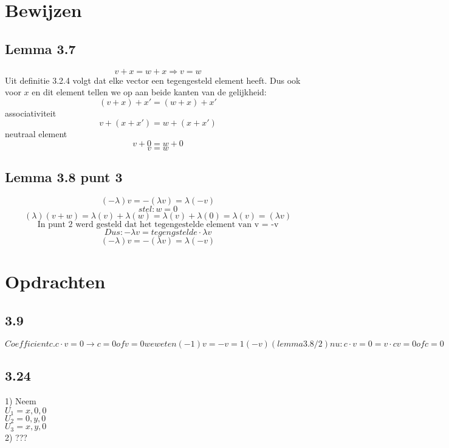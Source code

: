 \documentclass[10pt,a4paper]{article}
\begin{document}
\section*{Bewijzen}
\subsection*{Lemma 3.7}
$$v+x = w + x \Rightarrow v=w$$
Uit definitie 3.2.4 volgt dat elke vector een tegengesteld element heeft. Dus ook voor $x$ en dit element tellen we op aan beide kanten van de gelijkheid:
$$(v+x)+x' = (w + x) + x'$$
associativiteit
\[
v+(x+x') = w + (x + x')
\]
neutraal element
\[
v + 0 = w + 0
\]
\[
v = w
\]

\subsection*{Lemma 3.8 punt 3}
\[(-\lambda)v = -(\lambda v) = \lambda(-v)\]
\[stel:w=0\]
\[(\lambda)(v+w) = \lambda(v) + \lambda(w) = \lambda(v) + \lambda(0) = \lambda(v) = (\lambda v) \]
\[\text{In punt 2 werd gesteld dat het tegengestelde element van v = -v}\]
\[Dus: -\lambda v = tegengstelde \cdot \lambda v\]
\[(-\lambda)v = -(\lambda v) = \lambda(-v) \]

\section*{Opdrachten}
\subsection*{3.9}
\[
Coefficient c.
c \cdot v = 0 \rightarrow c = 0 of v = 0
we weten (-1)v = -v = 1(-v) (lemma3.8/2)
nu:  c \cdot v = 0 = v \cdot c
	v = 0 of c = 0
\]

\subsection{3.24}

1) 
Neem \\ 
$U_1 = {x,0,0} $\\
$U_2 =  {0,y,0} $\\
$U_3 = {x,y,0} $\\
2) ???
\end{document}
